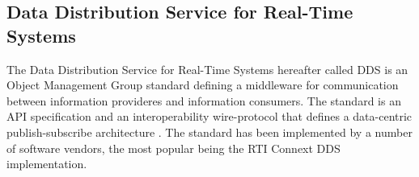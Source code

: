 









\subsection{Data Distribution Service for Real-Time Systems}
The Data Distribution Service for Real-Time Systems hereafter called DDS is an Object Management Group standard defining a middleware for communication between information provideres and information consumers.
The standard is an API specification and an interoperability wire-protocol that defines a data-centric publish-subscribe architecture \cite{pardo2003omg}.
The standard has been implemented by a number of software vendors, the most popular being the RTI Connext DDS implementation.

